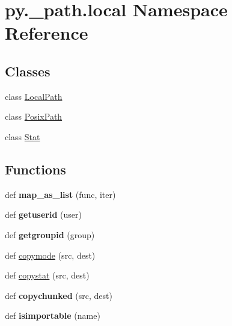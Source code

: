 \hypertarget{namespacepy_1_1__path_1_1local}{}\section{py.\+\_\+path.\+local Namespace Reference}
\label{namespacepy_1_1__path_1_1local}
\subsection*{Classes}
\begin{DoxyCompactItemize}
\item 
class \hyperlink{classpy_1_1__path_1_1local_1_1_local_path}{Local\+Path}
\item 
class \hyperlink{classpy_1_1__path_1_1local_1_1_posix_path}{Posix\+Path}
\item 
class \hyperlink{classpy_1_1__path_1_1local_1_1_stat}{Stat}
\end{DoxyCompactItemize}
\subsection*{Functions}
\begin{DoxyCompactItemize}
\item 
\mbox{\label{namespacepy_1_1__path_1_1local_ac202eeb567de48befd17bbec395a1770}} 
def {\bfseries map\+\_\+as\+\_\+list} (func, iter)
\item 
\mbox{\label{namespacepy_1_1__path_1_1local_a999468be1dc434f0463b8c9ff219a615}} 
def {\bfseries getuserid} (user)
\item 
\mbox{\label{namespacepy_1_1__path_1_1local_acf0d473ecda2ef56f80c136b94272e5c}} 
def {\bfseries getgroupid} (group)
\item 
def \hyperlink{namespacepy_1_1__path_1_1local_aff48f6647a92b496eb0a281e1227d202}{copymode} (src, dest)
\item 
def \hyperlink{namespacepy_1_1__path_1_1local_ad9c74f26f1e8066b942ae6ff27173be5}{copystat} (src, dest)
\item 
\mbox{\label{namespacepy_1_1__path_1_1local_aec2fe4ee418dc0edb28969b4f452a4ad}} 
def {\bfseries copychunked} (src, dest)
\item 
\mbox{\label{namespacepy_1_1__path_1_1local_a5f14354f85c45cceeb4ccf74ab13bc71}} 
def {\bfseries isimportable} (name)
\end{DoxyCompactItemize}
